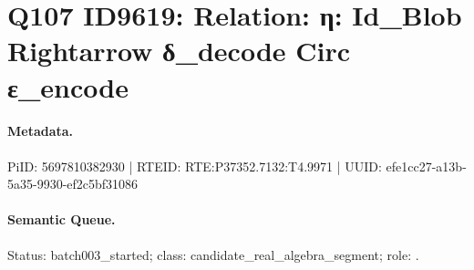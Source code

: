 \section*{Q107 ID9619: Relation: η: Id\_Blob Rightarrow δ\_decode Circ ε\_encode}
\paragraph{Metadata.}
PiID: 5697810382930 | RTEID: RTE:P37352.7132:T4.9971 | UUID: efe1cc27-a13b-5a35-9930-ef2c5bf31086

\paragraph{Semantic Queue.}
Status: batch003\_started; class: candidate\_real\_algebra\_segment; role: .

